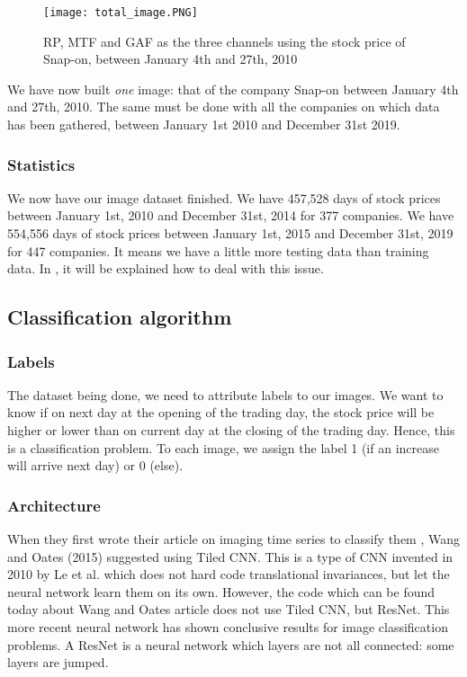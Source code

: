 \documentclass[11pt]{article}
\begin{document}
\begin{onehalfspace}
\begin{figure}[h!]
    \centering
    \captionsetup{justification=centering}
    \texttt{[image: total\_image.PNG]}
    \caption{RP, MTF and GAF as the three channels using the stock price of Snap-on, between January 4th and 27th, 2010}
\label{fig:final_image}
\end{figure}

We have now built \textit{one} image: that of the company Snap-on between January 4th and 27th, 2010. The same must be done with all the companies on which data has been gathered, between January 1st 2010 and December 31st 2019.

\subsubsection{Statistics}

We now have our image dataset finished. We have 457,528 days of stock prices between January 1st, 2010 and December 31st, 2014 for 377 companies. We have 554,556 days of stock prices between January 1st, 2015 and December 31st, 2019 for 447 companies. It means we have a little more testing data than training data. In , it will be explained how to deal with this issue. 

\subsection{Classification algorithm}

\subsubsection{Labels}

The dataset being done, we need to attribute labels to our images. We want to know if on next day at the opening of the trading day, the stock price will be higher or lower than on current day at the closing of the trading day. Hence, this is a classification problem. To each image, we assign the label 1 (if an increase will arrive next day) or 0 (else).

\subsubsection{Architecture}

When they first wrote their article on imaging time series to classify them \cite{wang}, Wang and Oates (2015) suggested using Tiled CNN. This is a type of CNN invented in 2010 \cite{le} by Le et al. which does not hard code translational invariances, but let the neural network learn them on its own. However, the code which can be found today about Wang and Oates article does not use Tiled CNN, but ResNet. This more recent neural network has shown conclusive results for image classification problems. A ResNet is a neural network which layers are not all connected: some layers are jumped. 


\end{onehalfspace}
\end{document}
